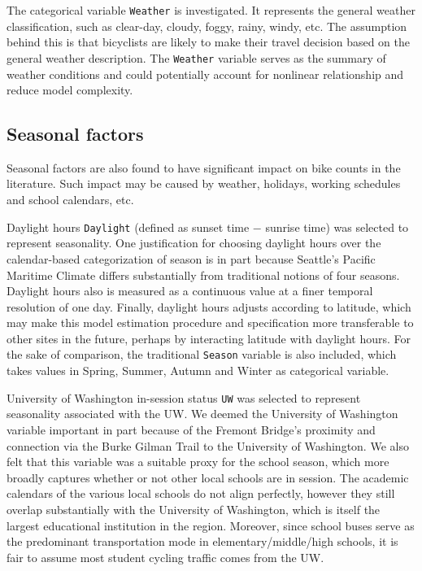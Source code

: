 \documentclass [11pt, proquest] {uwthesis}[2015/03/03]
\begin{document}
The categorical variable \texttt{Weather} is investigated. It represents the general weather classification, such as clear-day, cloudy, foggy, rainy, windy, etc. The assumption behind this is that bicyclists are likely to make their travel decision based on the general weather description. The \texttt{Weather} variable serves as the summary of weather conditions and could potentially account for nonlinear relationship and reduce model complexity.

\subsection{Seasonal factors}
Seasonal factors are also found to have significant impact on bike counts in the literature. Such impact may be caused by weather, holidays, working schedules and school calendars, etc.

Daylight hours \texttt{Daylight} (defined as sunset time $-$ sunrise time) was selected to represent seasonality. One justification for choosing daylight hours over the calendar-based categorization of season is in part because Seattle’s Pacific Maritime Climate differs substantially from traditional notions of four seasons. Daylight hours also is measured as a continuous value at a finer temporal resolution of one day. Finally, daylight hours adjusts according to latitude, which may make this model estimation procedure and specification more transferable to other sites in the future, perhaps by interacting latitude with daylight hours. For the sake of comparison, the traditional \texttt{Season} variable is also included, which takes values in Spring, Summer, Autumn and Winter as categorical variable.

University of Washington in-session status \texttt{UW} was selected to represent seasonality associated with the UW. We deemed the University of Washington variable important in part because of the Fremont Bridge's proximity and connection via the Burke Gilman Trail to the University of Washington. We also felt that this variable was a suitable proxy for the school season, which more broadly captures whether or not other local schools are in session. The academic calendars of the various local schools do not align perfectly, however they still overlap substantially with the University of Washington, which is itself the largest educational institution in the region. Moreover, since school buses serve as the predominant transportation mode in elementary/middle/high schools, it is fair to assume most student cycling traffic comes from the UW. 
\end{document}
